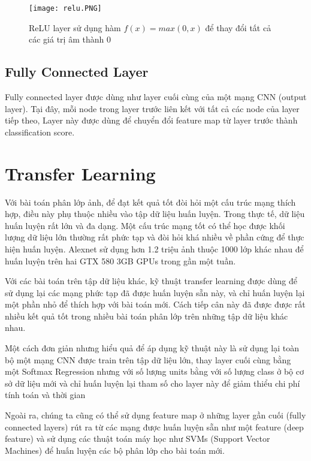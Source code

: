 \begin{figure}[h!]
	\centering
	\captionsetup{width=0.7\textwidth}
	\texttt{[image: relu.PNG]}
	\caption{ReLU layer sử dụng hàm $f(x) = max(0, x)$ để thay đổi tất cả các giá trị âm thành 0}
    \label{fig:relu}
\end{figure}

\subsection*{Fully Connected Layer}
Fully connected layer được dùng như layer cuối cùng của một mạng CNN (output layer). Tại đây, mỗi node trong layer trước liên kết với tất cả các node của layer tiếp theo, Layer này được dùng để chuyển đổi feature map từ layer trước thành classification score.

\section{Transfer Learning}
Với bài toán phân lớp ảnh, để đạt kết quả tốt đòi hỏi một cấu trúc mạng thích hợp, điều này phụ thuộc nhiều vào tập dữ liệu huấn luyện. Trong thực tế, dữ liệu huấn luyện rất lớn và đa dạng. Một cấu trúc mạng tốt có thể học được khối lượng dữ liệu lớn thường rất phức tạp và đòi hỏi khá nhiều về phần cứng để thực hiện huấn luyện. Alexnet \cite{krizhevsky2012imagenet} sử dụng hơn 1.2 triệu ảnh thuộc 1000 lớp khác nhau để huấn luyện trên hai GTX 580 3GB GPUs trong gần một tuần.

Với các bài toán trên tập dữ liệu khác, kỹ thuật transfer learning được dùng để sử dụng lại các mạng phức tạp đã được huấn luyện sẵn này, và chỉ huấn luyện lại một phần nhỏ để thích hợp với bài toán mới. Cách tiếp cân này đã được được rất nhiều kết quả tốt trong nhiều bài toán phân lớp trên những tập dữ liệu khác nhau.

Một cách đơn giản nhưng hiểu quả để áp dụng kỹ thuật này là sử dụng lại toàn bộ một mạng CNN được train trên tập dữ liệu lớn, thay layer cuối cùng bằng một Softmax Regression nhưng với số lượng units bằng với số lượng class ở bộ cơ sở dữ liệu mới và chỉ huấn luyện lại tham số cho layer này để giảm thiểu chi phí tính toán và thời gian

Ngoài ra, chúng ta cũng có thể sử dụng feature map ở những layer gần cuối (fully connected layers) rút ra từ các mạng được huấn luyện sẵn như một feature (deep feature) và sử dụng các thuật toán máy học như SVMs (Support Vector Machines) để huấn luyện các bộ phân lớp cho bài toán mới.